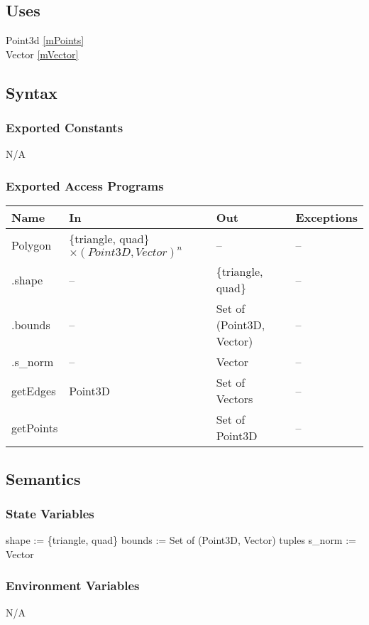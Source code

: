 \documentclass[12pt, titlepage]{article}
\begin{document}
\subsection{Uses}
Point3d \ref{mPoints} \\
Vector \ref{mVector}\\

\subsection{Syntax}
\subsubsection{Exported Constants}
N/A
\subsubsection{Exported Access Programs}
\begin{center}
	\begin{tabular}{p{4cm} p{2cm} p{2cm} p{4cm}}
		\hline
		\textbf{Name} & \textbf{In} & \textbf{Out} & \textbf{Exceptions} \\
		\hline
		Polygon & \{triangle, quad\} $\times (Point3D, Vector)^n$ & -- & -- \\
		.shape & -- & \{triangle, quad\} & -- \\
		.bounds & -- & Set of (Point3D, Vector) & -- \\
		.s\_norm & -- & Vector & -- \\
		getEdges & Point3D & Set of Vectors & -- \\
		getPoints & & Set of Point3D & -- \\
		\hline
	\end{tabular}
\end{center}

\subsection{Semantics}
\subsubsection{State Variables}
shape := \{triangle, quad\}
bounds := Set of (Point3D, Vector) tuples
s\_norm := Vector

\subsubsection{Environment Variables}
N/A
\end{document}
